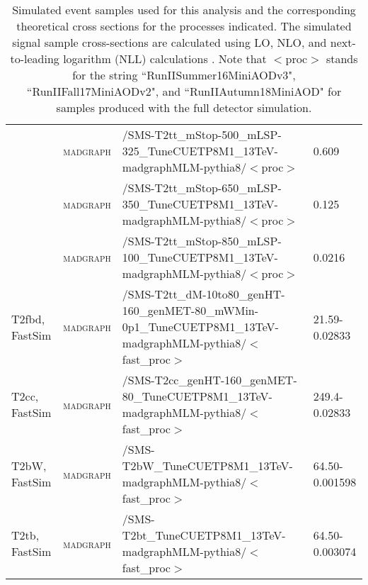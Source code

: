 \begin{table}[!htp]
\begin{center}
{\begin{tabular}{|l|l|l|l|}
     & \textsc{madgraph} & /SMS-T2tt\_mStop-500\_mLSP-325\_TuneCUETP8M1\_13TeV-madgraphMLM-pythia8/$<$proc$>$ & 0.609 \\
     & \textsc{madgraph} & /SMS-T2tt\_mStop-650\_mLSP-350\_TuneCUETP8M1\_13TeV-madgraphMLM-pythia8/$<$proc$>$ & 0.125 \\
     & \textsc{madgraph} & /SMS-T2tt\_mStop-850\_mLSP-100\_TuneCUETP8M1\_13TeV-madgraphMLM-pythia8/$<$proc$>$ & 0.0216 \\
\hline
T2fbd, FastSim & \textsc{madgraph} & /SMS-T2tt\_dM-10to80\_genHT-160\_genMET-80\_mWMin-0p1\_TuneCUETP8M1\_13TeV-madgraphMLM-pythia8/$<$fast\_proc$>$ & 21.59-0.02833 \\
T2cc, FastSim & \textsc{madgraph} & /SMS-T2cc\_genHT-160\_genMET-80\_TuneCUETP8M1\_13TeV-madgraphMLM-pythia8/$<$fast\_proc$>$ & 249.4-0.02833 \\
T2bW, FastSim & \textsc{madgraph} & /SMS-T2bW\_TuneCUETP8M1\_13TeV-madgraphMLM-pythia8/$<$fast\_proc$>$ & 64.50-0.001598 \\
T2tb, FastSim & \textsc{madgraph} & /SMS-T2bt\_TuneCUETP8M1\_13TeV-madgraphMLM-pythia8/$<$fast\_proc$>$ & 64.50-0.003074 \\
\hline
\end{tabular}
}
\end{center}
\caption[Signal Samples]{\label{tab:signals}Simulated event samples used for this analysis and the corresponding theoretical cross sections for the processes indicated. The simulated signal sample cross-sections are calculated using LO, NLO, and next-to-leading logarithm (NLL) calculations \cite{borschensky_squark_2014}. Note that $<$proc$>$ stands for the string ``RunIISummer16MiniAODv3", ``RunIIFall17MiniAODv2", and ``RunIIAutumn18MiniAOD" for samples produced with the full detector simulation.}
\end{table}
